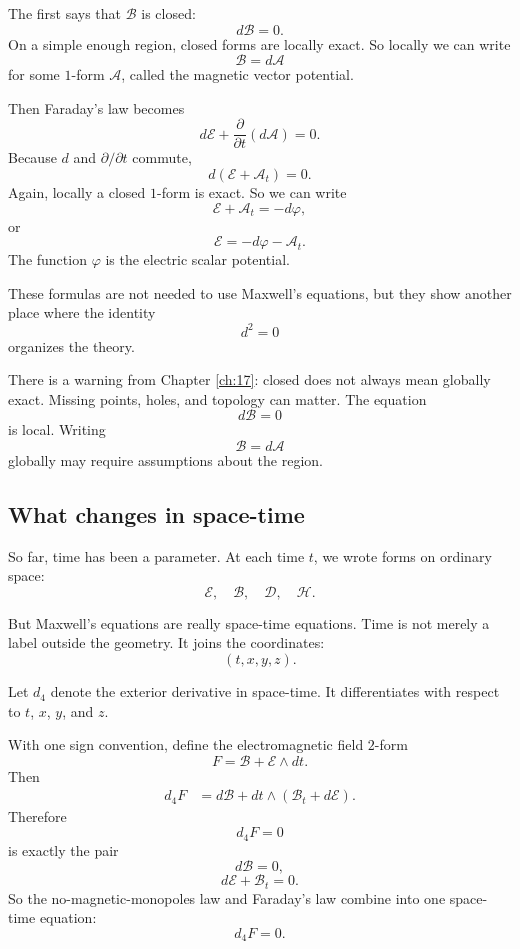The first says that \(\mathcal B\) is closed:
\[
    d\mathcal B=0.
\]
On a simple enough region, closed forms are locally exact.  So locally we can write
\[
\boxed{
    \mathcal B=d\mathcal A
}
\]
for some \(1\)-form \(\mathcal A\), called the magnetic vector potential.

Then Faraday's law becomes
\[
    d\mathcal E+\frac{\partial}{\partial t}(d\mathcal A)=0.
\]
Because \(d\) and \(\partial/\partial t\) commute,
\[
    d(\mathcal E+\mathcal A_t)=0.
\]
Again, locally a closed \(1\)-form is exact.  So we can write
\[
    \mathcal E+\mathcal A_t=-d\varphi,
\]
or
\[
\boxed{
    \mathcal E=-d\varphi-\mathcal A_t.
}
\]
The function \(\varphi\) is the electric scalar potential.

These formulas are not needed to use Maxwell's equations, but they show another place
where the identity
\[
    d^2=0
\]
organizes the theory.

There is a warning from Chapter \ref{ch:17}: closed does not always mean globally
exact.  Missing points, holes, and topology can matter.  The equation
\[
    d\mathcal B=0
\]
is local.  Writing
\[
    \mathcal B=d\mathcal A
\]
globally may require assumptions about the region.

\subsection{What changes in space-time}

So far, time has been a parameter.  At each time \(t\), we wrote forms on ordinary
space:
\[
    \mathcal E,\quad \mathcal B,\quad \mathcal D,\quad \mathcal H.
\]

But Maxwell's equations are really space-time equations.  Time is not merely a label
outside the geometry.  It joins the coordinates:
\[
    (t,x,y,z).
\]

Let
\(
    d_4
\)
denote the exterior derivative in space-time.  It differentiates with respect to \(t\),
\(x\), \(y\), and \(z\).

With one sign convention, define the electromagnetic field \(2\)-form
\[
\boxed{
    F=\mathcal B+\mathcal E\wedge dt.
}
\]
Then
\[
\begin{aligned}
d_4F
&=
d\mathcal B
+
dt\wedge\left(\mathcal B_t+d\mathcal E\right).
\end{aligned}
\]
Therefore
\[
\boxed{
    d_4F=0
}
\]
is exactly the pair
\[
    d\mathcal B=0,
\]
\[
    d\mathcal E+\mathcal B_t=0.
\]
So the no-magnetic-monopoles law and Faraday's law combine into one space-time
equation:
\[
\boxed{
    d_4F=0.
}
\]

